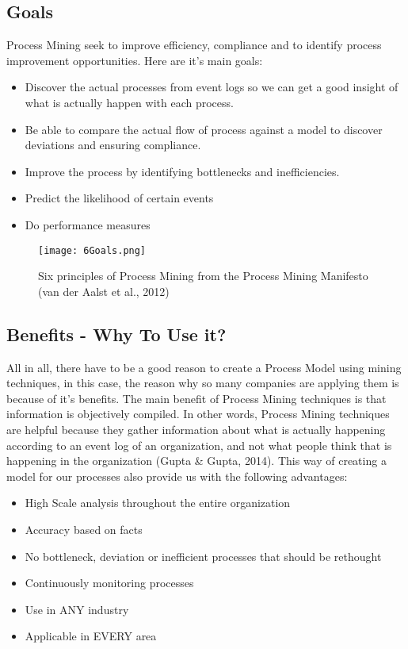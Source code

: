 \documentclass[conference]{IEEEtran}
\begin{document}
\subsection{Goals}
Process Mining seek to improve efficiency, compliance and to identify process improvement opportunities. Here are it's main goals:
\begin{itemize}
    \item Discover the actual processes from event logs so we can get a good insight of what is actually happen with each process.
    \item Be able to compare the actual flow of process against a model to discover deviations and ensuring compliance.
    \item Improve the process by identifying bottlenecks and inefficiencies.
    \item Predict the likelihood of certain events 
    \item Do performance measures
\end{itemize}

\begin{figure}[htp]
    \centering
    \texttt{[image: 6Goals.png]}
    \caption{Six principles of Process Mining from the Process Mining Manifesto   (van der Aalst et al., 2012)}
    \label{fig:modelDrawn}
\end{figure}


\subsection{Benefits - Why To Use it?}

All in all, there have to be a good reason to create a Process Model using mining techniques, in this case, the reason why so many companies are applying them is because of it's benefits.
The main benefit of Process Mining techniques is that information is objectively compiled. In other words, Process Mining techniques are helpful because they gather information about what is actually happening according to an event log of an organization, and not what people think that is happening in the organization (Gupta \& Gupta, 2014). 
This way of creating a model for our processes also provide us with the following advantages:

\begin{itemize}
    \item High Scale analysis throughout the entire organization
    \item Accuracy based on facts
    \item No bottleneck, deviation or inefficient processes that should be rethought
    \item Continuously monitoring processes
    \item Use in ANY industry
    \item Applicable in EVERY area
\end{itemize}
\end{document}
